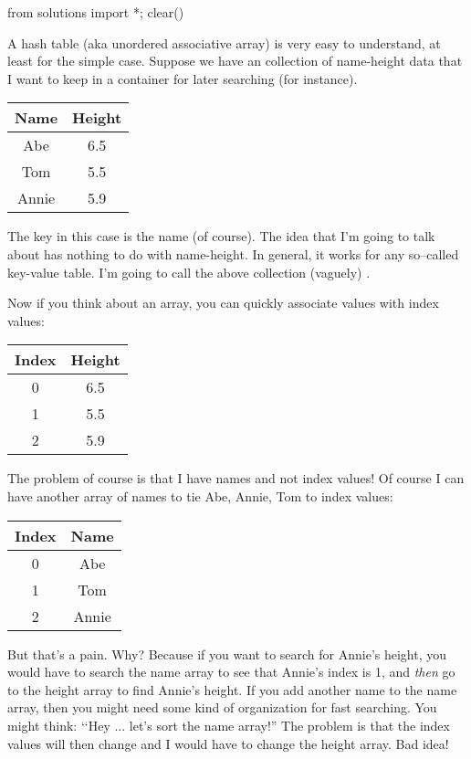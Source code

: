 \begin{python0}
from solutions import *; clear()
\end{python0}

A hash table (aka unordered associative array)
is very easy to understand, at least for the simple case.
Suppose we have an collection of name-height data that I want to 
keep in a container for later searching (for instance).
\begin{longtable}{|c|c|}
\hline
Name & Height \\
\hline
Abe &  6.5 \\
Tom &  5.5 \\
Annie &  5.9 \\
\hline
\end{longtable}
The key in this case is the name (of course).
The idea that I'm going to talk about has nothing to do with
name-height.
In general, it works for any so--called key-value table.
I'm going to call the above collection (vaguely) 
.

Now if you think about an array, you can quickly
associate values with index values:
\begin{longtable}{|c|c|}
\hline
Index & Height \\
\hline
0 &  6.5 \\
1 &  5.5 \\
2 &  5.9 \\
\hline
\end{longtable}
The problem of course is that I have names and not index values!
Of course I can have another array of names to tie Abe, Annie, Tom to
index values:
\begin{longtable}{|c|c|}
\hline
Index & Name \\
\hline
0 &  Abe \\
1 &  Tom \\
2 &  Annie \\
\hline
\end{longtable}
But that's a pain.
Why? 
Because if you want to search for Annie's height, you
would have to search the name array to see that Annie's index is 1,
and \textit{then} go to the height array to find Annie's height.
If you add another name to the name array, then you might need
some kind of organization for fast searching.
You might think: \lq\lq Hey ... let's sort the name array!''
The problem is that the index values will then change and I 
would have to change the height array.
Bad idea!

